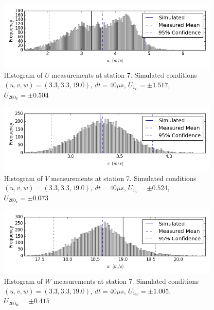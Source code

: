 \begin{figure}[H]
\centering
\includegraphics[width=6in]{figs/Ely_May28th07002/uncertainty_Ely_May28th07002_U}
\caption{Histogram of $U$ measurements at station 7. Simulated conditions $(u,v,w)=(3.3, 3.3, 19.0)$, $dt=40 \mu s$, $U_{1_{U}}=\pm 1.517$, $U_{200_{U}}=\pm 0.504$}
\label{fig:uncertainty_Ely_May28th07002_U}
\end{figure}


\begin{figure}[H]
\centering
\includegraphics[width=6in]{figs/Ely_May28th07002/uncertainty_Ely_May28th07002_V}
\caption{Histogram of $V$ measurements at station 7. Simulated conditions $(u,v,w)=(3.3, 3.3, 19.0)$, $dt=40 \mu s$, $U_{1_{V}}=\pm 0.524$, $U_{200_{V}}=\pm 0.073$}
\label{fig:uncertainty_Ely_May28th07002_V}
\end{figure}


\begin{figure}[H]
\centering
\includegraphics[width=6in]{figs/Ely_May28th07002/uncertainty_Ely_May28th07002_W}
\caption{Histogram of $W$ measurements at station 7. Simulated conditions $(u,v,w)=(3.3, 3.3, 19.0)$, $dt=40 \mu s$, $U_{1_{W}}=\pm 1.005$, $U_{200_{W}}=\pm 0.415$}
\label{fig:uncertainty_Ely_May28th07002_W}
\end{figure}



